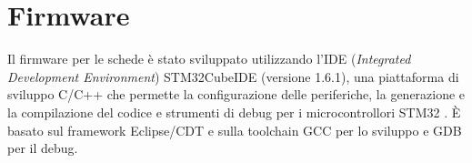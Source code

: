 \section{Firmware}
Il firmware per le schede è stato sviluppato utilizzando l'IDE (\textit{Integrated Development Environment}) STM32CubeIDE (versione 1.6.1), una piattaforma di sviluppo C/C++ che permette la configurazione delle periferiche, la generazione e la compilazione del codice e strumenti di debug per i microcontrollori STM32 \cite{STMicroelectronicsSTM32CubeIDE}. \`E basato sul framework Eclipse\textregistered/CDT e sulla toolchain GCC per lo sviluppo e GDB per il debug.


\cite{STMicroelectronicsHAL}
\pagebreak